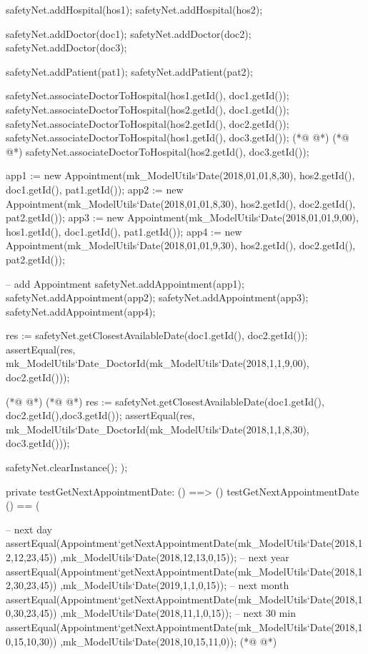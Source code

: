 \begin{vdmpp}[breaklines=true]
  safetyNet.addHospital(hos1);
  safetyNet.addHospital(hos2);
  
  safetyNet.addDoctor(doc1);
  safetyNet.addDoctor(doc2);
  safetyNet.addDoctor(doc3);
  
  safetyNet.addPatient(pat1);
  safetyNet.addPatient(pat2);

  safetyNet.associateDoctorToHospital(hos1.getId(), doc1.getId());
  safetyNet.associateDoctorToHospital(hos2.getId(), doc1.getId());
  safetyNet.associateDoctorToHospital(hos2.getId(), doc2.getId());
  safetyNet.associateDoctorToHospital(hos1.getId(), doc3.getId());
(*@
\label{testForgotToAddHospital:1001}
@*)
(*@
\label{testFailForgotToAddHospital:1001}
@*)
  safetyNet.associateDoctorToHospital(hos2.getId(), doc3.getId());
  
    
  app1 := new Appointment(mk_ModelUtils`Date(2018,01,01,8,30), hos2.getId(), doc1.getId(), pat1.getId());
  app2 := new Appointment(mk_ModelUtils`Date(2018,01,01,8,30), hos2.getId(), doc2.getId(), pat2.getId());
  app3 := new Appointment(mk_ModelUtils`Date(2018,01,01,9,00), hos1.getId(), doc1.getId(), pat1.getId());
  app4 := new Appointment(mk_ModelUtils`Date(2018,01,01,9,30), hos2.getId(), doc2.getId(), pat2.getId());

    
  -- add Appointment
  safetyNet.addAppointment(app1);
  safetyNet.addAppointment(app2);
  safetyNet.addAppointment(app3);
  safetyNet.addAppointment(app4);
 
 
  res := safetyNet.getClosestAvailableDate({doc1.getId(), doc2.getId()}); 
  assertEqual(res, mk_ModelUtils`Date_DoctorId(mk_ModelUtils`Date(2018,1,1,9,00), doc2.getId()));
  
(*@
\label{testFailCanNotRemoveAnAgreement:1020}
@*)
(*@
\label{testCanNotRemoveAnAgreement:1020}
@*)
  res := safetyNet.getClosestAvailableDate({doc1.getId(), doc2.getId(),doc3.getId()}); 
  assertEqual(res, mk_ModelUtils`Date_DoctorId(mk_ModelUtils`Date(2018,1,1,8,30), doc3.getId()));
  
  
  safetyNet.clearInstance(); 
);


private testGetNextAppointmentDate: () ==> ()
 testGetNextAppointmentDate () == (
 
  -- next day
  assertEqual(Appointment`getNextAppointmentDate(mk_ModelUtils`Date(2018,12,12,23,45)) ,mk_ModelUtils`Date(2018,12,13,0,15));
  -- next year
  assertEqual(Appointment`getNextAppointmentDate(mk_ModelUtils`Date(2018,12,30,23,45)) ,mk_ModelUtils`Date(2019,1,1,0,15));
  -- next month
  assertEqual(Appointment`getNextAppointmentDate(mk_ModelUtils`Date(2018,10,30,23,45)) ,mk_ModelUtils`Date(2018,11,1,0,15));
  -- next 30 min
  assertEqual(Appointment`getNextAppointmentDate(mk_ModelUtils`Date(2018,10,15,10,30)) ,mk_ModelUtils`Date(2018,10,15,11,0));
(*@
\label{testFailSearchForADoctor:1039}
@*)
 

\end{vdmpp}
